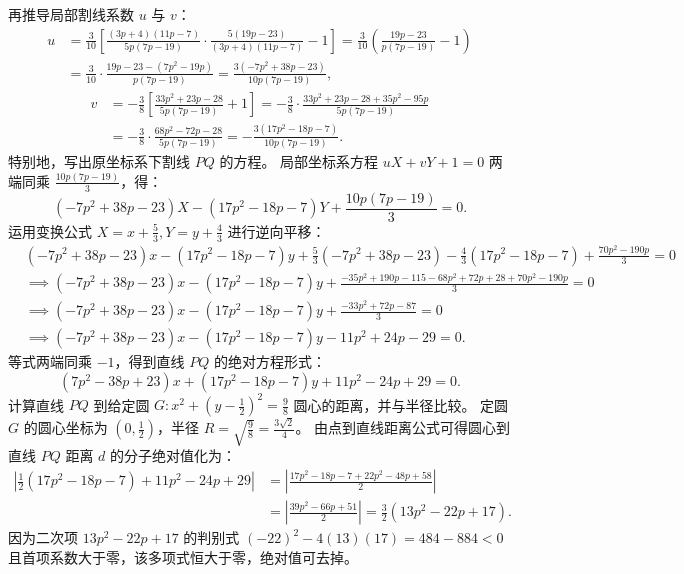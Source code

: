 \begin{solution}
再推导局部割线系数 $u$ 与 $v$：
\begin{align*}
u &= \frac{3}{10}\left[\frac{(3p + 4)(11p - 7)}{5p(7p - 19)} \cdot \frac{5(19p - 23)}{(3p + 4)(11p - 7)} - 1\right] = \frac{3}{10}\left(\frac{19p - 23}{p(7p - 19)} - 1\right) \\
&= \frac{3}{10} \cdot \frac{19p - 23 - (7p^2 - 19p)}{p(7p - 19)} = \frac{3(-7p^2 + 38p - 23)}{10p(7p - 19)},
\end{align*}
\begin{align*}
v &= -\frac{3}{8}\left[\frac{33p^2 + 23p - 28}{5p(7p - 19)} + 1\right] = -\frac{3}{8} \cdot \frac{33p^2 + 23p - 28 + 35p^2 - 95p}{5p(7p - 19)} \\
&= -\frac{3}{8} \cdot \frac{68p^2 - 72p - 28}{5p(7p - 19)} = -\frac{3(17p^2 - 18p - 7)}{10p(7p - 19)}.
\end{align*}
特别地，写出原坐标系下割线 $PQ$ 的方程。
局部坐标系方程 $uX + vY + 1 = 0$ 两端同乘 $\frac{10p(7p - 19)}{3}$，得：
\[ (-7p^2 + 38p - 23)X - (17p^2 - 18p - 7)Y + \frac{10p(7p - 19)}{3} = 0. \]
运用变换公式 $X = x + \frac{5}{3}, Y = y + \frac{4}{3}$ 进行逆向平移：
\begin{align*}
&(-7p^2 + 38p - 23)x - (17p^2 - 18p - 7)y + \frac{5}{3}(-7p^2 + 38p - 23) - \frac{4}{3}(17p^2 - 18p - 7) + \tfrac{70p^2 - 190p}{3} = 0 \\
&\implies (-7p^2 + 38p - 23)x - (17p^2 - 18p - 7)y + \tfrac{-35p^2 + 190p - 115 - 68p^2 + 72p + 28 + 70p^2 - 190p}{3} = 0 \\
&\implies (-7p^2 + 38p - 23)x - (17p^2 - 18p - 7)y + \frac{-33p^2 + 72p - 87}{3} = 0 \\
&\implies (-7p^2 + 38p - 23)x - (17p^2 - 18p - 7)y - 11p^2 + 24p - 29 = 0.
\end{align*}
等式两端同乘 $-1$，得到直线 $PQ$ 的绝对方程形式：
\[ (7p^2 - 38p + 23)x + (17p^2 - 18p - 7)y + 11p^2 - 24p + 29 = 0. \]
计算直线 $PQ$ 到给定圆 $G: x^2 + \left(y - \frac{1}{2}\right)^2 = \frac{9}{8}$ 圆心的距离，并与半径比较。
定圆 $G$ 的圆心坐标为 $\left(0, \frac{1}{2}\right)$，半径 $R = \sqrt{\frac{9}{8}} = \frac{3\sqrt{2}}{4}$。
由点到直线距离公式可得圆心到直线 $PQ$ 距离 $d$ 的分子绝对值化为：
\begin{align*}
\left| \frac{1}{2}(17p^2 - 18p - 7) + 11p^2 - 24p + 29 \right| &= \left| \frac{17p^2 - 18p - 7 + 22p^2 - 48p + 58}{2} \right| \\
&= \left| \frac{39p^2 - 66p + 51}{2} \right| = \frac{3}{2}(13p^2 - 22p + 17).
\end{align*}
因为二次项 $13p^2 - 22p + 17$ 的判别式 $(-22)^2 - 4(13)(17) = 484 - 884 < 0$ 且首项系数大于零，该多项式恒大于零，绝对值可去掉。

\end{solution}
